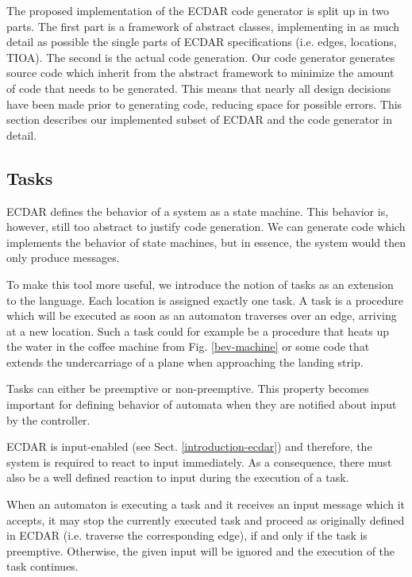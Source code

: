 The proposed implementation of the ECDAR code generator is split up
in two parts. The first part is a framework of abstract classes, implementing
in as much detail as possible the single parts of ECDAR specifications
(i.e. edges, locations, TIOA). The second is the actual code generation.
Our code generator generates source code which inherit from the abstract
framework to minimize the amount of code that needs to be
generated. This means that nearly all design decisions have been made
prior to generating code, reducing space for possible errors. This
section describes our implemented subset of ECDAR and the code generator
in detail.

\subsection{Tasks}
\label{subsec:tasks}

ECDAR defines the behavior of a system as a state machine. This behavior
is, however, still too abstract to justify code generation. We can
generate code which implements the behavior of state machines, but
in essence, the system would then only produce messages.

To make this tool more useful, we introduce the notion of tasks as an extension
to the language. Each location is assigned exactly one task. A task is a
procedure which will be executed as soon as an automaton traverses over an edge,
arriving at a new location. Such a task could for example be a procedure that
heats up the water in the coffee machine from Fig. \ref{bev-machine} or some code
that extends the undercarriage of a plane when approaching the landing strip.

Tasks can either be preemptive or non-preemptive. This property becomes
important for defining behavior of automata when they are notified
about input by the controller.

ECDAR is input-enabled (see Sect. \ref{introduction-ecdar}) and therefore,
the system is required to react to input immediately. As a consequence,
there must also be a well defined reaction to input during the execution
of a task.

When an automaton is executing a task and it receives an input message
which it accepts, it may stop the currently executed task and proceed
as originally defined in ECDAR (i.e. traverse the corresponding edge),
if and only if the task is preemptive. Otherwise, the given input
will be ignored and the execution of the task continues.

